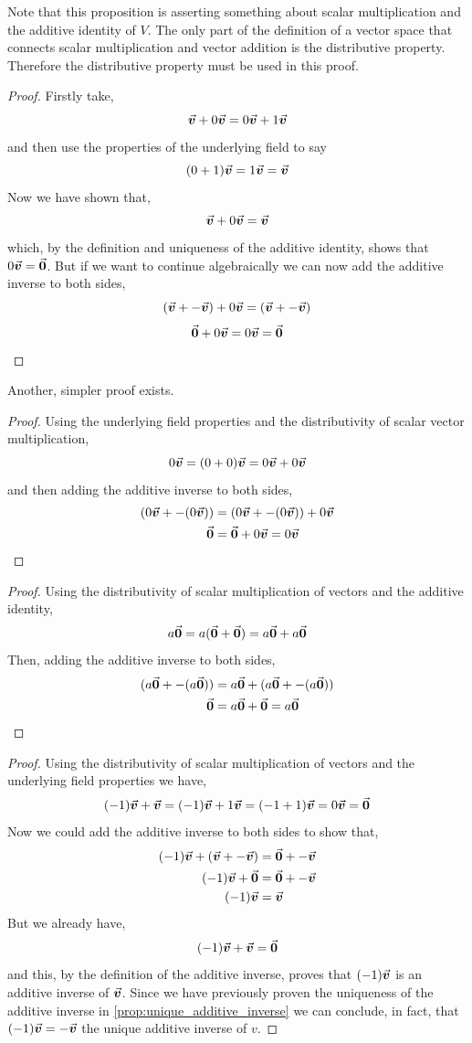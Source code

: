 \documentclass[MathsNotesBase.tex]{subfiles}
\begin{document}
{	
		Note that this proposition is asserting something about scalar multiplication and the additive identity of $V$. The only part of the definition of a vector space that connects scalar multiplication and vector addition is the distributive property. Therefore the distributive property must be used in this proof.
		\begin{proof}
		Firstly take,
		\[ \vec{\bm{v}} + 0\vec{\bm{v}} = 0\vec{\bm{v}} + 1\vec{\bm{v}} \]
		and then use the properties of the underlying field to say
		\[ (0 + 1)\vec{\bm{v}} = 1\vec{\bm{v}} = \vec{\bm{v}} \]
		Now we have shown that,
		\[ \vec{\bm{v}} + 0\vec{\bm{v}} = \vec{\bm{v}} \]
		which, by the definition and uniqueness of the additive identity, shows that $0\vec{\bm{v}} = \vec{\bm{0}}$. But if we want to continue algebraically we can now add the additive inverse to both sides,
		\[ (\vec{\bm{v}} + -\vec{\bm{v}}) + 0\vec{\bm{v}} = (\vec{\bm{v}} + -\vec{\bm{v}}) \]
		\[ \vec{\bm{0}} + 0\vec{\bm{v}} = 0\vec{\bm{v}} = \vec{\bm{0}} \qedhere\]
		\end{proof}
		Another, simpler proof exists. 
		\begin{proof}
		Using the underlying field properties and the distributivity of scalar vector multiplication,
		\[ 0\vec{\bm{v}} = (0 + 0)\vec{\bm{v}} = 0\vec{\bm{v}} + 0\vec{\bm{v}} \]
		and then adding the additive inverse to both sides,
		\begin{align*}
		(0\vec{\bm{v}} + -(0\vec{\bm{v}})) &= (0\vec{\bm{v}} + -(0\vec{\bm{v}})) + 0\vec{\bm{v}} \\
		\vec{\bm{0}} &= \vec{\bm{0}} + 0\vec{\bm{v}} = 0\vec{\bm{v}} \qedhere
		\end{align*}
		\end{proof}
		
	
		\begin{proof}
		Using the distributivity of scalar multiplication of vectors and the additive identity,
		\[ a\vec{\bm{0}} = a(\vec{\bm{0}} + \vec{\bm{0}}) = a\vec{\bm{0}} + a\vec{\bm{0}} \]
		Then, adding the additive inverse to both sides,
		\begin{align*}
		(a\vec{\bm{0}} + -(a\vec{\bm{0}})) &= a\vec{\bm{0}} + (a\vec{\bm{0}} + -(a\vec{\bm{0}}))\\
		\vec{\bm{0}} &= a\vec{\bm{0}} + \vec{\bm{0}} = a\vec{\bm{0}} \qedhere
		\end{align*}
		\end{proof}
		
	
		\begin{proof}
		Using the distributivity of scalar multiplication of vectors and the underlying field properties we have,
		\[ (-1)\vec{\bm{v}} + \vec{\bm{v}} = (-1)\vec{\bm{v}} + 1\vec{\bm{v}} = (-1 + 1)\vec{\bm{v}} = 0\vec{\bm{v}} = \vec{\bm{0}} \]
		Now we could add the additive inverse to both sides to show that,
		\begin{align*} 
		(-1)\vec{\bm{v}} + (\vec{\bm{v}} + -\vec{\bm{v}}) &= \vec{\bm{0}} + -\vec{\bm{v}} \\
		(-1)\vec{\bm{v}} + \vec{\bm{0}} &= \vec{\bm{0}} + -\vec{\bm{v}} \\
		(-1)\vec{\bm{v}} &= \vec{\bm{v}} \qedhere
		\end{align*}
		But we already have,
		\[ (-1)\vec{\bm{v}} + \vec{\bm{v}} =\vec{\bm{0}} \]
		and this, by the definition of the additive inverse, proves that $(-1)\vec{\bm{v}}$ is an additive inverse of $\vec{\bm{v}}$. Since we have previously proven the uniqueness of the additive inverse in \autoref{prop:unique_additive_inverse} we can conclude, in fact, that $(-1)\vec{\bm{v}} = -\vec{\bm{v}}$ the unique additive inverse of $v$.
		\end{proof}
	}
	
\end{document}
